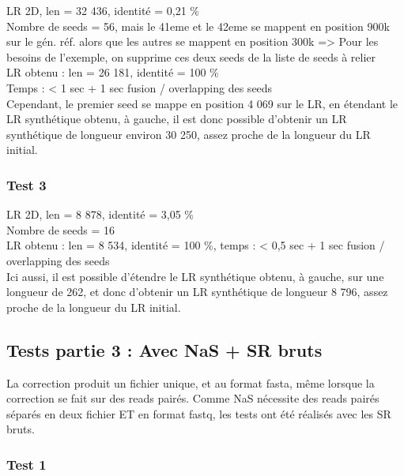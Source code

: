 \documentclass[12pt]{article}
\begin{document}
LR 2D, len = 32 436, identité = 0,21 \% \\

Nombre de seeds = 56, mais le 41eme et le 42eme se mappent en position 900k sur le gén. réf. alors que les autres se mappent en position 300k => Pour les besoins de l'exemple, on supprime ces deux seeds de la liste de seeds à relier \\

LR obtenu : len = 26 181, identité = 100 \% \\
Temps : < 1 sec + 1 sec fusion / overlapping des seeds \\

Cependant, le premier seed se mappe en position 4 069 sur le LR, en étendant le LR synthétique obtenu, à gauche, il est donc possible d'obtenir un LR synthétique de longueur environ 30 250, assez proche de la longueur du LR initial.

\subsubsection{Test 3}

LR 2D, len = 8 878, identité = 3,05 \% \\

Nombre de seeds = 16 \\

LR obtenu : len = 8 534, identité = 100 \%, temps : < 0,5 sec + 1 sec fusion / overlapping des seeds \\

Ici aussi, il est possible d'étendre le LR synthétique obtenu, à gauche, sur une longueur de 262, et donc d'obtenir un LR  synthétique de longueur 8 796, assez proche de la longueur du LR initial. \\

\subsection{Tests partie 3 : Avec NaS + SR bruts}

La correction produit un fichier unique, et au format fasta, même lorsque la correction se fait sur des reads pairés. Comme NaS nécessite des reads pairés séparés en deux fichier ET en format fastq, les tests ont été réalisés avec les SR bruts. \\

\subsubsection{Test 1}
\end{document}
